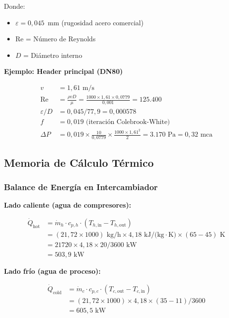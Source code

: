 \documentclass[12pt,a4paper]{article}
\begin{document}
Donde:
\begin{itemize}
    \item $\varepsilon = 0{,}045$~mm (rugosidad acero comercial)
    \item Re = Número de Reynolds
    \item $D$ = Diámetro interno
\end{itemize}

\textbf{Ejemplo: Header principal (DN80)}

\begin{align}
v &= 1{,}61 \text{ m/s} \\
\text{Re} &= \frac{\rho v D}{\mu} = \frac{1000 \times 1{,}61 \times 0{,}0779}{0{,}001} = 125.400 \\
\varepsilon/D &= 0{,}045/77{,}9 = 0{,}000578 \\
f &= 0{,}019 \text{ (iteración Colebrook-White)} \\
\Delta P &= 0{,}019 \times \frac{10}{0{,}0779} \times \frac{1000 \times 1{,}61^2}{2} = 3.170 \text{ Pa} = 0{,}32 \text{ mca}
\end{align}

\subsection{Memoria de Cálculo Térmico}

\subsubsection{Balance de Energía en Intercambiador}

\textbf{Lado caliente (agua de compresores):}

\begin{align}
\dot{Q}_{\text{hot}} &= \dot{m}_h \cdot c_{p,h} \cdot (T_{h,\text{in}} - T_{h,\text{out}}) \\
&= (21{,}72 \times 1000) \text{ kg/h} \times 4{,}18 \text{ kJ/(kg}\cdot\text{K)} \times (65 - 45) \text{ K} \\
&= 21720 \times 4{,}18 \times 20/3600 \text{ kW} \\
&= 503{,}9 \text{ kW}
\end{align}

\textbf{Lado frío (agua de proceso):}

\begin{align}
\dot{Q}_{\text{cold}} &= \dot{m}_c \cdot c_{p,c} \cdot (T_{c,\text{out}} - T_{c,\text{in}}) \\
&= (21{,}72 \times 1000) \times 4{,}18 \times (35 - 11)/3600 \\
&= 605{,}5 \text{ kW}
\end{align}
\end{document}
